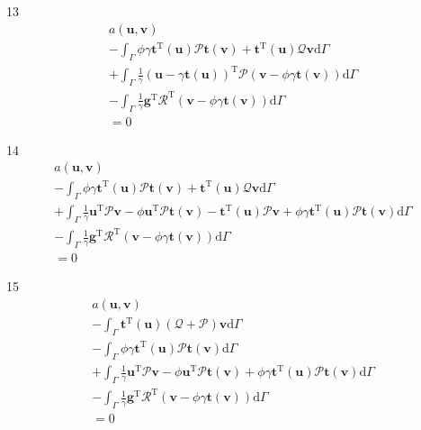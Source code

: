 \documentclass[a4paper,12pt]{article}
\begin{document}
13
\begin{equation}
\begin{split}
a(\mathbf{u},\mathbf{v})
\\-
\int_\Gamma
\phi\gamma\mathbf{t}^{\textrm{T}}(\mathbf{u})\mathcal{P}\mathbf{t}(\mathbf{v})
+
\mathbf{t}^\textrm{T}(\mathbf{u})\mathcal{Q}\mathbf{v}
\textrm{d}\Gamma
\\+
\int_\Gamma
\frac{1}{\gamma}
(\mathbf{u}-\gamma\mathbf{t}(\mathbf{u}))^\textrm{T}\mathcal{P}
(\mathbf{v}-\phi\gamma\mathbf{t}(\mathbf{v}))
\textrm{d}\Gamma
\\-
\int_\Gamma
\frac{1}{\gamma}
\mathbf{g}^\textrm{T}\mathcal{R}^\textrm{T}
(\mathbf{v}-\phi\gamma\mathbf{t}(\mathbf{v}))
\textrm{d}\Gamma
\\=
0
\end{split}
\end{equation}

14
\begin{equation}
\begin{split}
a(\mathbf{u},\mathbf{v})
\\-
\int_\Gamma
\phi\gamma\mathbf{t}^{\textrm{T}}(\mathbf{u})\mathcal{P}\mathbf{t}(\mathbf{v})
+
\mathbf{t}^\textrm{T}(\mathbf{u})\mathcal{Q}\mathbf{v}
\textrm{d}\Gamma
\\+
\int_\Gamma
\frac{1}{\gamma}
\mathbf{u}^\textrm{T}\mathcal{P}\mathbf{v}
-
\phi\mathbf{u}^\textrm{T}\mathcal{P}\mathbf{t}(\mathbf{v})
-
\mathbf{t}^\textrm{T}(\mathbf{u})\mathcal{P}\mathbf{v}
+
\phi\gamma\mathbf{t}^\textrm{T}(\mathbf{u})\mathcal{P}\mathbf{t}(\mathbf{v})
\textrm{d}\Gamma
\\-
\int_\Gamma
\frac{1}{\gamma}
\mathbf{g}^\textrm{T}\mathcal{R}^\textrm{T}
(\mathbf{v}-\phi\gamma\mathbf{t}(\mathbf{v}))
\textrm{d}\Gamma
\\=
0
\end{split}
\end{equation}

15
\begin{equation}
\begin{split}
a(\mathbf{u},\mathbf{v})
\\-
\int_\Gamma
\mathbf{t}^\textrm{T}(\mathbf{u})(\mathcal{Q}+\mathcal{P})\mathbf{v}
\textrm{d}\Gamma
\\-
\int_\Gamma
\phi\gamma\mathbf{t}^{\textrm{T}}(\mathbf{u})\mathcal{P}\mathbf{t}(\mathbf{v})
\textrm{d}\Gamma
\\+
\int_\Gamma
\frac{1}{\gamma}
\mathbf{u}^\textrm{T}\mathcal{P}\mathbf{v}
-
\phi\mathbf{u}^\textrm{T}\mathcal{P}\mathbf{t}(\mathbf{v})
+
\phi\gamma\mathbf{t}^\textrm{T}(\mathbf{u})\mathcal{P}\mathbf{t}(\mathbf{v})
\textrm{d}\Gamma
\\-
\int_\Gamma
\frac{1}{\gamma}
\mathbf{g}^\textrm{T}\mathcal{R}^\textrm{T}
(\mathbf{v}-\phi\gamma\mathbf{t}(\mathbf{v}))
\textrm{d}\Gamma
\\=
0
\end{split}
\end{equation}
\end{document}
